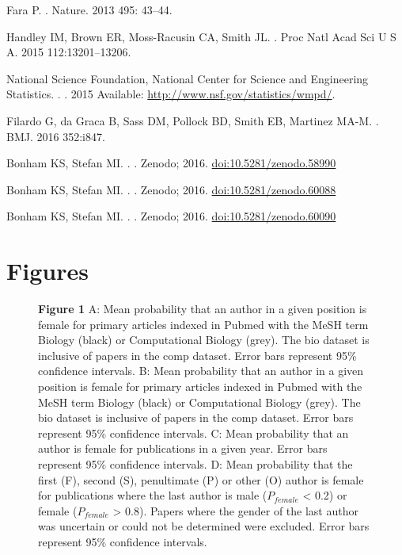\documentclass[10pt,letterpaper]{article}
\begin{document}
\begin{flushleft}
\begin{thebibliography}{10}
Fara P.
.
\newblock Nature. 2013  495: 43–44.

Handley IM, Brown ER, Moss-Racusin CA, Smith JL.
.
\newblock  Proc Natl Acad Sci U S A.  2015 112:13201–13206.


National Science Foundation, National Center for Science and Engineering Statistics.
.
\newblock  [Internet]. 2015 Available: \url{http://www.nsf.gov/statistics/wmpd/}.

 Filardo G, da Graca B, Sass DM, Pollock BD, Smith EB, Martinez MA-M.
.
\newblock BMJ. 2016 352:i847.


Bonham KS, Stefan MI.
.
\newblock   [Internet]. Zenodo; 2016. \url{doi:10.5281/zenodo.58990}

Bonham KS, Stefan MI.
.
\newblock  [Internet]. Zenodo; 2016. \url{doi:10.5281/zenodo.60088}

 Bonham KS, Stefan MI.
.
\newblock  [Internet]. Zenodo; 2016. \url{doi:10.5281/zenodo.60090}





\end{thebibliography}




\section*{Figures}
\begin{figure}[!h]
  \caption{{\bf Figure 1}
  A: Mean probability that an author in a given position is female for primary articles indexed in Pubmed with the MeSH term Biology (black) or Computational Biology (grey). The bio dataset is inclusive of papers in the comp dataset. Error bars represent 95\% confidence intervals. B: Mean probability that an author in a given position is female for primary articles indexed in Pubmed with the MeSH term Biology (black) or Computational Biology (grey). The bio dataset is inclusive of papers in the comp dataset. Error bars represent 95\% confidence intervals. C: Mean probability that an author is female for publications in a given year. Error bars represent 95\% confidence intervals. D: Mean probability that the first (F), second (S), penultimate (P) or other (O) author is female for publications where the last author is male ($P_{female}$ < 0.2) or female ($P_{female}$ > 0.8). Papers where the gender of the last author was uncertain or could not be determined were excluded. Error bars represent 95\% confidence intervals.}
  \label{fig1}
\end{figure}


\end{flushleft}
\end{document}
